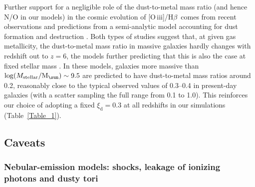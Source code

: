 \documentclass[fleqn,usenatbib]{mnras}
\newcommand{\Msun}{\hbox{M$_\sun$}}
\newcommand{\oiiihb}{\hbox{[O\,{\sc iii}]/H$\beta$}}
\begin{document}
Further support for a negligible role of the dust-to-metal mass
ratio (and hence N/O in our models) in the cosmic
evolution of \oiiihb\ comes  from recent observations
\citep[e.g.,][]{RemyRuyer14,DeCia16,Wiseman17}  and predictions from a
semi-analytic model accounting for dust formation  
and destruction \citep[][]{Popping16}. Both types of studies suggest that, 
at given gas metallicity, the dust-to-metal mass ratio in massive galaxies
hardly changes with redshift out to $z=6$, the models further predicting that this
is also the case at fixed stellar mass \citep[see figs~5 and 6 of][]{Popping16}. In 
these models, galaxies more massive than $\log(M_{\rm stellar}/\Msun)\sim9.5$ 
are predicted to have dust-to-metal mass ratios around 0.2, reasonably close to 
the typical observed values of 0.3--0.4 in present-day galaxies (with a scatter 
sampling the full range from 0.1 to 1.0). This reinforces our choice of 
adopting a fixed $\xi_\mathrm{d} = 0.3$ at all redshifts in our
simulations (Table~\ref{Table_1}).   

\subsection{Caveats}\label{caveats} 

\subsubsection{Nebular-emission models: shocks, leakage of ionizing photons and dusty tori}
\end{document}
